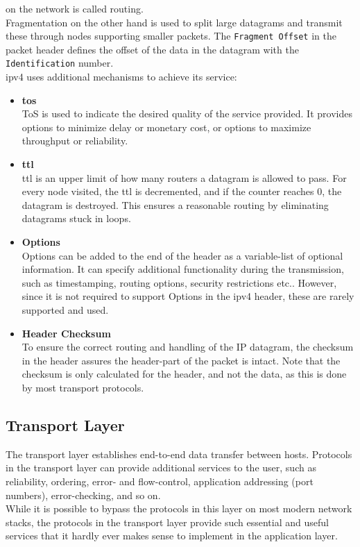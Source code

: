 on the network is called routing\cite{RFC0791}.\\
Fragmentation on the other hand is used to split large datagrams and transmit
these through nodes supporting smaller packets. The \texttt{Fragment Offset} in
the packet header defines the offset of the data in the datagram with the
\texttt{Identification} number.\\
\gls{ipv4} uses additional mechanisms to achieve its service:
\begin{itemize}
	\item \textbf{\gls{tos}}\\
	ToS is used to indicate the desired quality of the service provided.
	It provides options to minimize delay or monetary cost, or options to
		maximize throughput or
		reliability\cite{tcpip_illustrated_vol1}\cite{RFC0791}.
	\item \textbf{\gls{ttl}}\\
	\gls{ttl} is an upper limit of how many routers a datagram is allowed
		to pass. For every node visited, the \gls{ttl} is decremented,
		and if the counter reaches $0$, the datagram is destroyed. This
		ensures a reasonable routing by eliminating datagrams stuck in
		loops\cite{RFC0791}.
	\item \textbf{Options}\\
	Options can be added to the end of the header as a variable-list of
		optional information. It can specify additional functionality
		during the transmission, such as timestamping, routing options,
		security restrictions etc.. However, since it is not required
		to support Options in the \gls{ipv4} header, these are rarely
		supported and used\cite{tcpip_illustrated_vol1}.
	\item \textbf{Header Checksum}\\
	To ensure the correct routing and handling of the IP datagram, the
		checksum in the header assures the header-part of the packet is
		intact. Note that the checksum is only calculated for the
		header, and not the data, as this is done by most transport
		protocols.
\end{itemize}


\subsection{Transport Layer}
The transport layer establishes end-to-end data transfer between hosts.
Protocols in the transport layer can provide additional services to the user,
such as reliability, ordering, error- and flow-control, application addressing
(port numbers), error-checking, and so on.\\
While it is possible to bypass the protocols in this layer on most modern
network stacks, the protocols in the transport layer provide such essential
and useful services that it hardly ever makes sense to implement in the
application layer.

